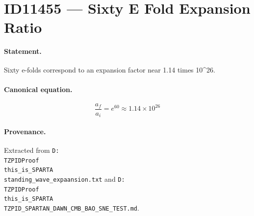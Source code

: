 \section*{ID11455 --- Sixty E Fold Expansion Ratio}

\paragraph{Statement.}
Sixty e-folds correspond to an expansion factor near 1.14 times 10^26.

\paragraph{Canonical equation.}
\[
\frac{a_f}{a_i}=e^{60}\approx1.14\times10^{26}
\]

\paragraph{Provenance.}
Extracted from \texttt{D:\\TZPIDProof\\this\_is\_SPARTA\\standing\_wave\_expaansion.txt} and \texttt{D:\\TZPIDProof\\this\_is\_SPARTA\\TZPID\_SPARTAN\_DAWN\_CMB\_BAO\_SNE\_TEST.md}.
